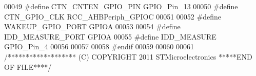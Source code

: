 \begin{DoxyCode}
00049 \textcolor{preprocessor}{#}\textcolor{preprocessor}{define} \textcolor{preprocessor}{CTN\_CNTEN\_GPIO\_PIN}      \textcolor{preprocessor}{GPIO\_Pin\_13}
00050 \textcolor{preprocessor}{#}\textcolor{preprocessor}{define} \textcolor{preprocessor}{CTN\_GPIO\_CLK}            \textcolor{preprocessor}{RCC\_AHBPeriph\_GPIOC}
00051 
00052 \textcolor{preprocessor}{#}\textcolor{preprocessor}{define} \textcolor{preprocessor}{WAKEUP\_GPIO\_PORT}        GPIOA
00053 
00054 \textcolor{preprocessor}{#}\textcolor{preprocessor}{define} \textcolor{preprocessor}{IDD\_MEASURE\_PORT}    GPIOA
00055 \textcolor{preprocessor}{#}\textcolor{preprocessor}{define} \textcolor{preprocessor}{IDD\_MEASURE}             \textcolor{preprocessor}{GPIO\_Pin\_4}
00056 
00057 
00058 \textcolor{preprocessor}{#}\textcolor{preprocessor}{endif}
00059 
00060 
00061 \textcolor{comment}{/******************* (C) COPYRIGHT 2011 STMicroelectronics *****END OF FILE****/}
\end{DoxyCode}
